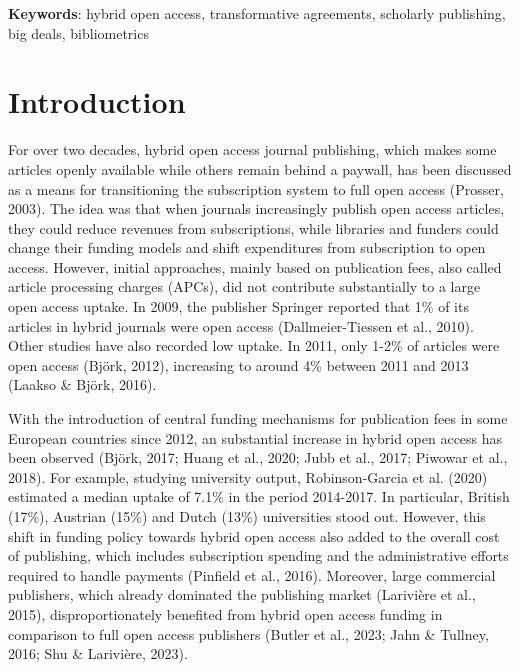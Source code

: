 \documentclass[a4paper,man,floatsintext,longtable,noextraspace,12pt]{apa6}
\begin{document}
{\textbf{Keywords}: hybrid open access, transformative agreements, scholarly publishing, big deals, bibliometrics}

\newpage

\setcounter{secnumdepth}{2}

\section{Introduction}\label{introduction}

For over two decades, hybrid open access journal publishing, which makes
some articles openly available while others remain behind a paywall, has
been discussed as a means for transitioning the subscription system to
full open access (Prosser, 2003). The idea was that when journals
increasingly publish open access articles, they could reduce revenues
from subscriptions, while libraries and funders could change their
funding models and shift expenditures from subscription to open access.
However, initial approaches, mainly based on publication fees, also
called article processing charges (APCs), did not contribute
substantially to a large open access uptake. In 2009, the publisher
Springer reported that 1\% of its articles in hybrid journals were open
access (Dallmeier-Tiessen et al., 2010). Other studies have also
recorded low uptake. In 2011, only 1-2\% of articles were open access
(Björk, 2012), increasing to around 4\% between 2011 and 2013 (Laakso \&
Björk, 2016).

With the introduction of central funding mechanisms for publication fees
in some European countries since 2012, an substantial increase in hybrid
open access has been observed (Björk, 2017; Huang et al., 2020; Jubb et
al., 2017; Piwowar et al., 2018). For example, studying university
output, Robinson-Garcia et al. (2020) estimated a median uptake of 7.1\%
in the period 2014-2017. In particular, British (17\%), Austrian (15\%)
and Dutch (13\%) universities stood out. However, this shift in funding
policy towards hybrid open access also added to the overall cost of
publishing, which includes subscription spending and the administrative
efforts required to handle payments (Pinfield et al., 2016). Moreover,
large commercial publishers, which already dominated the publishing
market (Larivière et al., 2015), disproportionately benefited from
hybrid open access funding in comparison to full open access publishers
(Butler et al., 2023; Jahn \& Tullney, 2016; Shu \& Larivière, 2023).
\end{document}

